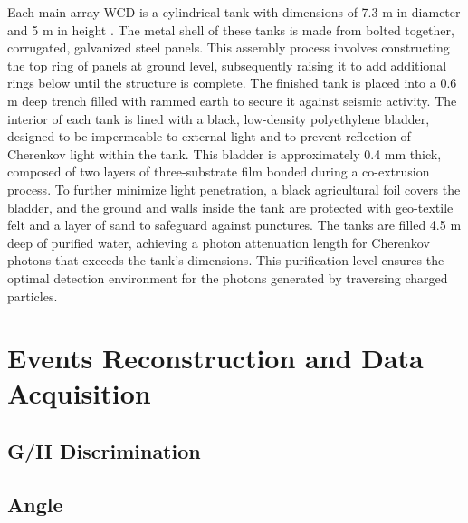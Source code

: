 Each main array WCD is a cylindrical tank with dimensions of 7.3 m in diameter and 5 m in height \cite{HAWC_NIM}.
The metal shell of these tanks is made from bolted together, corrugated, galvanized steel panels.
This assembly process involves constructing the top ring of panels at ground level, subsequently raising it to add additional rings below until the structure is complete.
The finished tank is placed into a 0.6 m deep trench filled with rammed earth to secure it against seismic activity.
The interior of each tank is lined with a black, low-density polyethylene bladder, designed to be impermeable to external light and to prevent reflection of Cherenkov light within the tank.
This bladder is approximately 0.4 mm thick, composed of two layers of three-substrate film bonded during a co-extrusion process.
To further minimize light penetration, a black agricultural foil covers the bladder, and the ground and walls inside the tank are protected with geo-textile felt and a layer of sand to safeguard against punctures.
The tanks are filled 4.5 m deep of purified water, achieving a photon attenuation length for Cherenkov photons that exceeds the tank's dimensions.
This purification level ensures the optimal detection environment for the photons generated by traversing charged particles.

\section{Events Reconstruction and Data Acquisition}
\subsection{G/H Discrimination}

\subsection{Angle}

